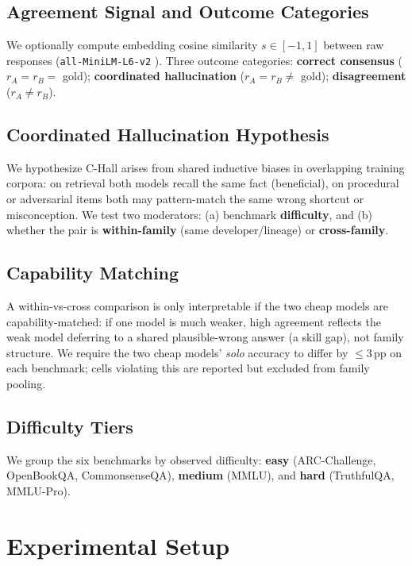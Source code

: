 \documentclass[conference]{IEEEtran}
\begin{document}
\subsection{Agreement Signal and Outcome Categories}
We optionally compute embedding cosine similarity $s\in[-1,1]$ between raw
responses (\texttt{all-MiniLM-L6-v2} \cite{reimers2019sentencebert}). Three
outcome categories: \textbf{correct consensus} ($r_A=r_B=$ gold);
\textbf{coordinated hallucination} ($r_A=r_B\neq$ gold);
\textbf{disagreement} ($r_A\neq r_B$).

\subsection{Coordinated Hallucination Hypothesis}
We hypothesize C-Hall arises from shared inductive biases in overlapping
training corpora: on retrieval both models recall the same fact (beneficial),
on procedural or adversarial items both may pattern-match the same wrong
shortcut or misconception. We test two moderators: (a) benchmark
\textbf{difficulty}, and (b) whether the pair is \textbf{within-family} (same
developer/lineage) or \textbf{cross-family}.

\subsection{Capability Matching}
A within-vs-cross comparison is only interpretable if the two cheap models are
capability-matched: if one model is much weaker, high agreement reflects the
weak model deferring to a shared plausible-wrong answer (a skill gap), not
family structure. We require the two cheap models' \textit{solo} accuracy to
differ by $\leq 3$\,pp on each benchmark; cells violating this are reported but
excluded from family pooling.

\subsection{Difficulty Tiers}
We group the six benchmarks by observed difficulty: \textbf{easy}
(ARC-Challenge, OpenBookQA, CommonsenseQA), \textbf{medium} (MMLU), and
\textbf{hard} (TruthfulQA, MMLU-Pro).

\section{Experimental Setup}
\label{sec:setup}
\end{document}

